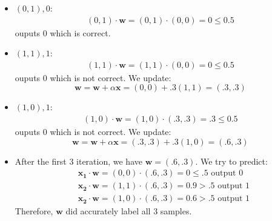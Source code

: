 \documentclass{article}
\begin{document}
\begin{itemize}
    \item $(0,1),0:$ 
    \begin{equation*}
        \begin{split}
            (0,1) \cdot \mathbf{w} = (0,1) \cdot (0,0) = 0 \leq  0.5
        \end{split}
    \end{equation*}
    ouputs 0 which is correct.
    \item $(1,1),1:$
    \begin{equation*}
        \begin{split}
            (1,1) \cdot \mathbf{w} = (1,1) \cdot (0,0) = 0 \leq  0.5
        \end{split}
    \end{equation*}
    ouputs 0 which is not correct. We update:
    \begin{equation}
        \mathbf{w} = \mathbf{w} + \alpha \mathbf{x} =(0,0) + .3 (1,1) = (.3,.3)
    \end{equation}
    \item $(1,0),1:$
    \begin{equation*}
        \begin{split}
            (1,0) \cdot \mathbf{w} = (1,0) \cdot (.3,.3) =.3  \leq  0.5
        \end{split}
    \end{equation*}
    ouputs 0 which is not correct. We update:
    \begin{equation}
        \mathbf{w} = \mathbf{w} + \alpha \mathbf{x} =(.3,.3) + .3 (1,0) = (.6,.3)
    \end{equation}

    \item After the first 3 iteration, we have $\mathbf{w} = (.6,.3)$. We try to predict:
    \begin{equation}
    \begin{split}
        &\mathbf{x_1}\cdot \mathbf{w} = (0,0)\cdot (.6,.3) = 0 \leq .5 \text{ output } 0
        \\&\mathbf{x_2}\cdot \mathbf{w} = (1,1)\cdot (.6,.3) = 0.9 > .5 \text{ output } 1
        \\&\mathbf{x_2}\cdot \mathbf{w} = (1,0)\cdot (.6,.3) = 0.6 > .5 \text{ output } 1
    \end{split}
    \end{equation}
    Therefore, $\textbf{w}$ did accurately label all 3 samples. 
\end{itemize}
\end{document}
